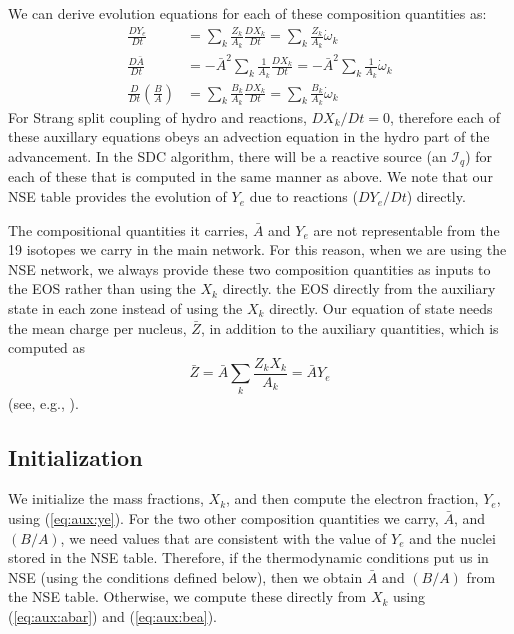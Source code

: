 \documentclass[times,modern]{aastex63}
\newcommand{\omegadot}{\dot{\omega}}
\newcommand{\Ic}{{\boldsymbol{\mathcal{I}}}}
\begin{document}
We can derive evolution equations for each of these composition quantities as:
\begin{align}
\frac{DY_e}{Dt} &= \sum_k \frac{Z_k}{A_k} \frac{DX_k}{Dt} = \sum_k \frac{Z_k}{A_k} \omegadot_k \\
\frac{D\bar{A}}{Dt} &= -\bar{A}^2 \sum_k \frac{1}{A_k} \frac{DX_k}{Dt} = -\bar{A}^2 \sum_k \frac{1}{A_k} \omegadot_k \\
\frac{D}{Dt} \left (\frac{B}{A} \right ) &= \sum_k \frac{B_k}{A_k} \frac{DX_k}{Dt} = \sum_k \frac{B_k}{A_k} \omegadot_k
\end{align}
For Strang split coupling of hydro and reactions, $DX_k/Dt = 0$,
therefore each of these auxillary equations obeys an advection
equation in the hydro part of the advancement.  In the SDC algorithm,
there will be a reactive source (an $\Ic_q$) for each of these that is
computed in the same manner as above.  We note that our NSE table
provides the evolution of $Y_e$ due to reactions ($DY_e/Dt$) directly.

The compositional quantities
it carries, $\bar{A}$ and $Y_e$ are not representable from the 19
isotopes we carry in the main network. For this reason, when we are
using the NSE network, we always provide these two composition quantities as
inputs to the EOS rather than using the $X_k$ directly.
the EOS directly from the auxiliary state in each zone instead of
using the $X_k$ directly.
Our equation of state needs the mean charge per nucleus, $\bar{Z}$, in addition
to the auxiliary quantities, which is computed as
\begin{equation}
\bar{Z} = \bar{A} \sum_k \frac{Z_k X_k}{A_k} = \bar{A} Y_e
\end{equation}
(see, e.g., \citealt{flash}).

\subsection{Initialization}

We initialize the mass fractions, $X_k$, and then compute the
electron fraction, $Y_e$, using (\ref{eq:aux:ye}).
For the two other composition
quantities we carry, $\bar{A}$, and $(B/A)$, we need values that are
consistent with the value of $Y_e$ and the nuclei stored in the NSE
table.  Therefore, if the thermodynamic conditions put us in NSE
(using the conditions defined below), then we obtain $\bar{A}$ and
$(B/A)$ from the NSE table.  Otherwise, we compute these directly from
$X_k$ using (\ref{eq:aux:abar}) and (\ref{eq:aux:bea}).
\end{document}
